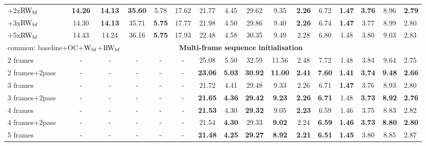\documentclass[runningheads]{llncs}
\begin{document}
\begin{table}[]
\begin{adjustbox}{max width=\textwidth}
\begin{tabular}{l|ccccc|cc|cc|ccc|ccc}
\multicolumn{1}{|l|}{+2x$\rm RW_{bf}$} & \textbf{14.26} & \textbf{14.13} & \textbf{35.60} & 5.78 & 17.62 & 21.77 & 4.45 & 29.62 & 9.35 & \textbf{2.26} & 6.72 & \textbf{1.47} & \textbf{3.76} & 8.96 & \multicolumn{1}{|l|}{\textbf{2.79}} \\
\multicolumn{1}{|l|}{+3x$\rm RW_{bf}$} & 14.30 & \textbf{14.13} & 35.71 & \textbf{5.75} & 17.77 & 21.98 & 4.50 & 29.86 & 9.40 & \textbf{2.26} & 6.74 & \textbf{1.47} & 3.77 & 8.99 & \multicolumn{1}{|l|}{2.80} \\
\multicolumn{1}{|l|}{+5x$\rm RW_{bf}$} & 14.43 & 14.24 & 36.16 & \textbf{5.75} & 17.93 & 22.48 & 4.58 & 30.35 & 9.49 & 2.28 & 6.80 & 1.48 & 3.80 & 9.03 & \multicolumn{1}{|l|}{2.83} \\ \hline \hline 
\multicolumn{3}{|l}{common: baseline+OC+$\rm W_{bf}$+$\rm RW_{bf}$} & \multicolumn{10}{c}{\textbf{Multi-frame sequence initialisation}} & \multicolumn{3}{l|}{} \\ \hline
\multicolumn{1}{|l|}{2 frames}& - & - & - & - & - & 25.08 & 5.50 & 32.59 & 11.56 & 2.48 & 7.72 & 1.48 & 3.84 & 9.64 & \multicolumn{1}{|l|}{2.75} \\
\multicolumn{1}{|l|}{2 frames+2pass}& - & - & - & - & - &  \textbf{23.06} & \textbf{5.03} & \textbf{30.92} & \textbf{11.00} & \textbf{2.41} & \textbf{7.60} & \textbf{1.41} & \textbf{3.74} & \textbf{9.48} & \multicolumn{1}{|l|}{\textbf{2.66}} \\ \hline
\multicolumn{1}{|l|}{3 frames}& - & - & - & - & - &  21.72 & 4.41 & 29.48 & 9.33 & 2.26 & 6.71 & \textbf{1.47} & 3.76 & 8.93 & \multicolumn{1}{|l|}{2.80} \\
\multicolumn{1}{|l|}{3 frames+2pass}& - & - & - & - & - &  \textbf{21.65} & \textbf{4.36} & \textbf{29.42} & \textbf{9.23} & \textbf{2.26} & \textbf{6.71} & 1.48 & \textbf{3.73} & \textbf{8.92} & \multicolumn{1}{|l|}{\textbf{2.76}} \\ \hline
 \multicolumn{1}{|l|}{4 frames}& - & - & - & - & - &  \textbf{21.53} & 4.30 & \textbf{29.32} & 9.05 & \textbf{2.23} & 6.59 & 1.46 & 3.75 & 8.83 & \multicolumn{1}{|l|}{2.82} \\
 \multicolumn{1}{|l|}{4 frames+2pass}& - & - & - & - & - &  21.54 & \textbf{4.30} & 29.33 & \textbf{9.02} & 2.24 & \textbf{6.59} & \textbf{1.46} & \textbf{3.73} & \textbf{8.80} & \multicolumn{1}{|l|}{\textbf{2.80}} \\ \hline
 \multicolumn{1}{|l|}{5 frames}& - & - & - & - & - &  \textbf{21.48} & \textbf{4.25} & \textbf{29.27} & \textbf{8.92} & \textbf{2.21} & \textbf{6.51} & \textbf{1.45} & 3.80 & 8.85 & \multicolumn{1}{|l|}{2.87} \\

\end{tabular}
\end{adjustbox}
\end{table}
\end{document}
